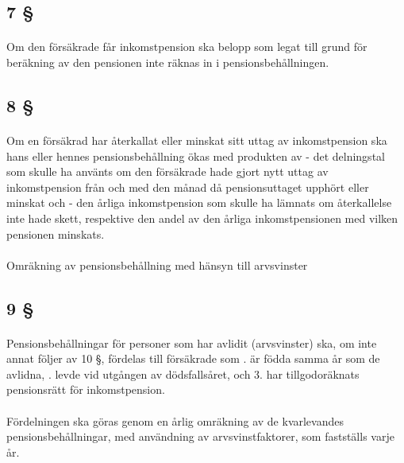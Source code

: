 \documentclass[a4paper,notitlepage,openany,10pt]{book}
\begin{document}
\subsection*{7 §}
\paragraph*{}
Om den försäkrade får inkomstpension ska belopp som legat till grund för beräkning av den pensionen inte räknas in i pensionsbehållningen.
\subsection*{8 §}
\paragraph*{}
Om en försäkrad har återkallat eller minskat sitt uttag av inkomstpension ska hans eller hennes pensionsbehållning ökas med produkten av
\newline - det delningstal som skulle ha använts om den försäkrade hade gjort nytt uttag av inkomstpension från och med den månad då pensionsuttaget upphört eller minskat och - den årliga inkomstpension som skulle ha lämnats om återkallelse inte hade skett, respektive den andel av den årliga inkomstpensionen med vilken pensionen minskats.
\paragraph*{}
Omräkning av pensionsbehållning med hänsyn till arvsvinster
\subsection*{9 §}
\paragraph*{}
Pensionsbehållningar för personer som har avlidit (arvsvinster) ska, om inte annat följer av 10 §, fördelas till försäkrade som
. är födda samma år som de avlidna,
. levde vid utgången av dödsfallsåret, och 3. har tillgodoräknats pensionsrätt för inkomstpension.
\paragraph*{}
Fördelningen ska göras genom en årlig omräkning av de kvarlevandes pensionsbehållningar, med användning av arvsvinstfaktorer, som fastställs varje år.
\end{document}
